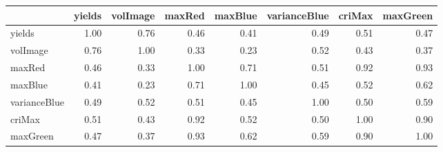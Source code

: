 \begin{tabular}{lrrrrrrr}
\toprule
{} &  yields &  volImage &  maxRed &  maxBlue &  varianceBlue &  criMax &  maxGreen \\
\midrule
yields       &    1.00 &      0.76 &    0.46 &     0.41 &          0.49 &    0.51 &      0.47 \\
volImage     &    0.76 &      1.00 &    0.33 &     0.23 &          0.52 &    0.43 &      0.37 \\
maxRed       &    0.46 &      0.33 &    1.00 &     0.71 &          0.51 &    0.92 &      0.93 \\
maxBlue      &    0.41 &      0.23 &    0.71 &     1.00 &          0.45 &    0.52 &      0.62 \\
varianceBlue &    0.49 &      0.52 &    0.51 &     0.45 &          1.00 &    0.50 &      0.59 \\
criMax       &    0.51 &      0.43 &    0.92 &     0.52 &          0.50 &    1.00 &      0.90 \\
maxGreen     &    0.47 &      0.37 &    0.93 &     0.62 &          0.59 &    0.90 &      1.00 \\
\bottomrule
\end{tabular}
